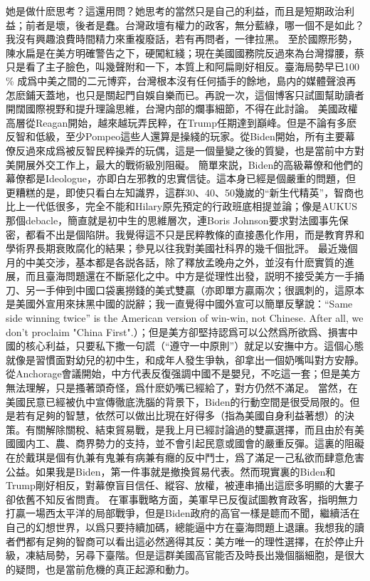\documentclass[twocolumn]{ctexart}
\begin{document}
她是做什麽思考？這還用問？她思考的當然只是自己的利益，而且是短期政治利益；前者是壞，後者是蠢。台灣政壇有權力的政客，無分藍綠，哪一個不是如此？我沒有興趣浪費時間精力來重複廢話，若有再問者，一律拉黑。
至於國際形勢，陳水扁是在美方明確警告之下，硬闖紅綫；現在美國國務院反過來為台灣撐腰，蔡只是看了主子臉色，叫幾聲附和一下，本質上和阿扁剛好相反。臺海局勢早已100 \% 成爲中美之間的二元博弈，台灣根本沒有任何插手的餘地，島内的媒體聲浪再怎麽鋪天蓋地，也只是關起門自娛自樂而已。再說一次，這個博客只試圖幫助讀者開闊國際視野和提升理論思維，台灣内部的爛事細節，不得在此討論。
美國政權高層從Reagan開始，越來越玩弄民粹，在Trump任期達到巔峰。但是不論有多麽反智和低級，至少Pompeo這些人還算是操綫的玩家。從Biden開始，所有主要幕僚反過來成爲被反智民粹操弄的玩偶，這是一個量變之後的質變，也是當前中方對美開展外交工作上，最大的戰術級別阻礙。
簡單來説，Biden的高級幕僚和他們的幕僚都是Ideologue，亦即白左邪教的忠實信徒。這本身已經是個嚴重的問題，但更糟糕的是，即使只看白左知識界，這群30、40、50幾嵗的“新生代精英”，智商也比上一代低很多，完全不能和Hilary原先預定的行政班底相提並論；像是AUKUS那個debacle，簡直就是初中生的思維層次，連Boris Johnson要求對法國事先保密，都看不出是個陷阱。我覺得這不只是民粹教條的直接愚化作用，而是教育界和學術界長期衰敗腐化的結果；參見以往我對美國社科界的幾千個批評。
最近幾個月的中美交涉，基本都是各説各話，除了釋放孟晚舟之外，並沒有什麽實質的進展，而且臺海問題還在不斷惡化之中。中方是從理性出發，説明不接受美方一手捅刀、另一手伸到中國口袋裏撈錢的美式雙贏（亦即單方贏兩次；很諷刺的，這原本是美國外宣用來抹黑中國的説辭；我一直覺得中國外宣可以簡單反擊說：“Same side winning twice” is the American version of win-win, not Chinese. After all, we don't proclaim "China First".）；但是美方卻堅持認爲可以公然爲所欲爲、損害中國的核心利益，只要私下撒一句謊（“遵守一中原則”）就足以安撫中方。這個心態就像是習慣面對幼兒的初中生，和成年人發生爭執，卻拿出一個奶嘴叫對方安靜。從Anchorage會議開始，中方代表反復强調中國不是嬰兒，不吃這一套；但是美方無法理解，只是搔著頭奇怪，爲什麽奶嘴已經給了，對方仍然不滿足。
當然，在美國民意已經被仇中宣傳徹底洗腦的背景下，Biden的行動空間是很受局限的。但是若有足夠的智慧，依然可以做出比現在好得多（指為美國自身利益著想）的決策。有關解除關稅、結束貿易戰，是我上月已經討論過的雙贏選擇，而且由於有美國國内工、農、商界勢力的支持，並不會引起民意或國會的嚴重反彈。這裏的阻礙在於戴琪是個有仇兼有鬼兼有病兼有癮的反中鬥士，爲了滿足一己私欲而肆意危害公益。如果我是Biden，第一件事就是撤換貿易代表。然而現實裏的Biden和Trump剛好相反，對幕僚盲目信任、縱容、放權，被連串捅出這麽多明顯的大婁子卻依舊不知反省問責。
在軍事戰略方面，美軍早已反復試圖教育政客，指明無力打贏一場西太平洋的局部戰爭，但是Biden政府的高官一樣是聼而不聞，繼續活在自己的幻想世界，以爲只要持續加碼，總能逼中方在臺海問題上退讓。我想我的讀者們都有足夠的智商可以看出這必然適得其反：美方唯一的理性選擇，在於停止升級，凍結局勢，另尋下臺階。但是這群美國高官能否及時長出幾個腦細胞，是很大的疑問，也是當前危機的真正起源和動力。
\end{document}
